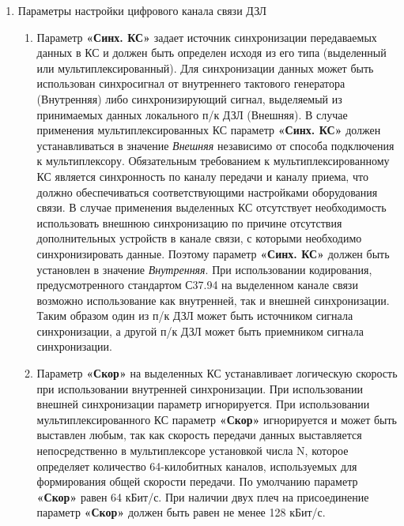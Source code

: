 \begin{enumerate}
\item Параметры настройки цифрового канала связи ДЗЛ
\begin{enumerate}
\item Параметр \textbf{«Синх. КС»} задает источник синхронизации передаваемых данных в КС и должен быть определен исходя из его типа (выделенный или мультиплексированный). Для синхронизации данных может быть использован синхросигнал от внутреннего тактового генератора (Внутренняя) либо синхронизирующий сигнал, выделяемый из принимаемых данных локального п/к ДЗЛ (Внешняя). В случае применения мультиплексированных КС параметр \textbf{«Синх. КС»} должен устанавливаться в значение \textit{Внешняя} независимо от способа подключения к мультиплексору. Обязательным требованием к мультиплексированному КС является синхронность по каналу передачи и каналу приема, что должно обеспечиваться соответствующими настройками оборудования связи. В случае применения выделенных КС отсутствует необходимость использовать внешнюю синхронизацию по причине отсутствия дополнительных устройств в канале связи, с которыми необходимо синхронизировать данные. Поэтому параметр \textbf{«Синх. КС»} должен быть установлен в значение \textit{Внутренняя}. При использовании кодирования, предусмотренного стандартом С37.94 на выделенном канале связи возможно использование как внутренней, так и внешней синхронизации. Таким образом один из п/к ДЗЛ может быть источником сигнала синхронизации, а другой п/к ДЗЛ может быть приемником сигнала синхронизации.
\item Параметр \textbf{«Скор»} на выделенных КС устанавливает логическую скорость при использовании внутренней синхронизации. При использовании внешней синхронизации параметр игнорируется. При использовании мультиплексированного КС параметр \textbf{«Скор»} игнорируется и может быть выставлен любым, так как скорость передачи данных выставляется непосредственно в мультиплексоре установкой числа N, которое определяет количество 64-килобитных каналов, используемых для формирования общей скорости передачи. По умолчанию параметр \textbf{«Скор»} равен 64 кБит/с. При наличии двух плеч на присоединение параметр \textbf{«Скор»} должен быть равен не менее 128 кБит/с.

\end{enumerate}
\end{enumerate}
